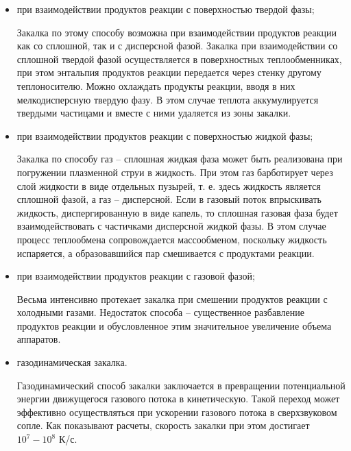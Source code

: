 \documentclass[10pt, a4paper]{article}
\begin{document}
\begin{itemize}
	
	\item при взаимодействии продуктов реакции с поверхностью твердой фазы;
	
	Закалка по этому способу возможна при взаимодействии продуктов реакции как со сплошной, так и с дисперсной фазой. Закалка при взаимодействии со сплошной твердой фазой осуществляется в поверхностных теплообменниках, при этом энтальпия продуктов реакции передается через стенку другому теплоносителю. Можно охлаждать продукты реакции, вводя в них мелкодисперсную твердую фазу. В этом случае теплота аккумулируется твердыми частицами и вместе с ними удаляется из зоны закалки.
	
	\item при взаимодействии продуктов реакции с поверхностью жидкой фазы;
	
	Закалка по способу газ -- сплошная жидкая фаза может быть реализована при погружении плазменной струи в жидкость. При этом газ барботирует через слой жидкости в виде отдельных пузырей, т. е. здесь жидкость является сплошной фазой, а газ -- дисперсной. Если в газовый поток впрыскивать жидкость, диспергированную в виде капель, то сплошная газовая фаза будет взаимодействовать с частичками дисперсной жидкой фазы. В этом случае процесс теплообмена сопровождается массообменом, поскольку жидкость испаряется, а образовавшийся пар смешивается с продуктами реакции.
	
	\item при взаимодействии продуктов реакции с газовой фазой;
	
	Весьма интенсивно протекает закалка при смешении продуктов реакции с холодными газами. Недостаток способа -- существенное разбавление продуктов реакции и обусловленное этим значительное увеличение объема аппаратов.
	
	\item газодинамическая закалка.
	
	Газодинамический способ закалки заключается в превращении потенциальной энергии движущегося газового потока в кинетическую. Такой переход может эффективно осуществляться при ускорении газового потока в сверхзвуковом сопле. Как показывают расчеты, скорость закалки при этом достигает $10^7-10^8$ К/с.
	
\end{itemize}
\end{document}
